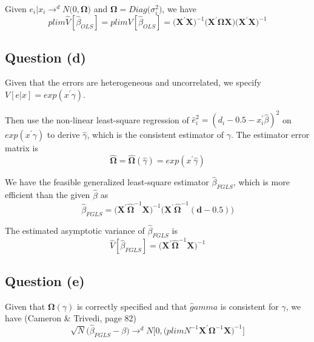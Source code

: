 \documentclass{article}
\begin{document}
Given $e_i \bigg| x_i \rightarrow^d N\bigg(0, \pmb{\Omega} \bigg)$ and $\pmb{\Omega} = Diag\bigg(\sigma_i^2 \bigg)$, we have 
\begin{equation*}
plim \hat V [\hat \beta_{OLS}] = plim V [\hat \beta_{OLS}] = \bigg(\pmb{X}^\prime \pmb{X}\bigg)^{-1} \bigg(\pmb{X}^\prime \pmb{\Omega} \pmb{X} \bigg)  \bigg(\pmb{X}^\prime \pmb{X}\bigg)^{-1}
\end{equation*}

\subsection*{Question (d)}
Given that the errors are heterogeneous and uncorrelated, we specify $V[e \big| x ] = exp(x^\prime \gamma)$. 

Then use the non-linear least-square regression of $\hat e_i^2 = (d_i - 0.5 - x_i^\prime \hat \beta)^2$ on $exp(x^\prime \gamma)$ to derive $\hat \gamma$, which is the consistent estimator of $\gamma$. The estimator error matrix is 
\begin{equation*}
\pmb{\hat \Omega} = \pmb{\hat \Omega}(\hat \gamma) = exp(x^\prime \hat \gamma)
\end{equation*} 

We have the feasible generalized least-square estimator $\hat{\beta}_{FGLS}$, which is more efficient than the given $\hat{\beta}$ as 
\begin{equation*}
\hat{\beta}_{FGLS} = \bigg(\pmb{X}^\prime \pmb{\hat \Omega}^{-1} \pmb{X} \bigg)^{-1} \bigg(\pmb{X}^\prime \pmb{\hat \Omega}^{-1} (\pmb{d - 0.5} ) \bigg)
\end{equation*}

The estimated asymptotic variance of $\hat{\beta}_{FGLS}$ is 
\begin{equation}
\hat V [\hat \beta_{FGLS}] = \bigg(\pmb{X}^\prime \pmb{\hat \Omega}^{-1} \pmb{X} \bigg)^{-1}  
\end{equation}

\subsection*{Question (e)}
Given that $\pmb{\Omega}(\gamma)$ is correctly specified and that $\hat gamma$ is consistent for $\gamma$, we have (Cameron \& Trivedi, page 82)
\begin{equation*}
\sqrt{N} \bigg( \hat \beta_{FGLS} - \beta \bigg) \rightarrow^{d} N\bigg[0, \bigg( plim N^{-1} \pmb{X}^\prime \pmb{\Omega}^{-1} \pmb{X} \bigg)^{-1} \bigg]
\end{equation*}
\end{document}
